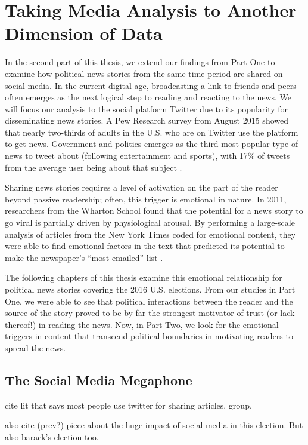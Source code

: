 \chapter{Taking Media Analysis to Another Dimension of Data}
In the second part of this thesis, we extend our findings from Part One to examine how political news stories from the same time period are shared on social media. In the current digital age, broadcasting a link to friends and peers often emerges as the next logical step to reading and reacting to the news. We will focus our analysis to the social platform Twitter due to its popularity for disseminating news stories. A Pew Research survey from August 2015 showed that nearly two-thirds of adults in the U.S. who are on Twitter use the platform to get news.  Government and politics emerges as the third most popular type of news to tweet about (following entertainment and sports), with 17\% of tweets from the average user being about that subject \cite{pew-twitter-news}.

Sharing news stories requires a level of activation on the part of the reader beyond passive readership; often, this trigger is emotional in nature. In 2011, researchers from the Wharton School found that the potential for a news story to go viral is partially driven by physiological arousal. By performing a large-scale analysis of articles from the New York Times coded for emotional content, they were able to find emotional factors in the text that predicted its potential to make the newspaper’s “most-emailed” list \cite{berger2012makes}.

The following chapters of this thesis examine this emotional relationship for political news stories covering the 2016 U.S. elections. From our studies in Part One, we were able to see that political interactions between the reader and the source of the story proved to be by far the strongest motivator of trust (or lack thereof!) in reading the news. Now, in Part Two, we look for the emotional triggers in content that transcend political boundaries in motivating readers to spread the news.




\section{The Social Media Megaphone}
cite lit that says most people use twitter for sharing articles.
group. 

also cite (prev?) piece about the huge impact of social media in this election. But also barack's election too.



